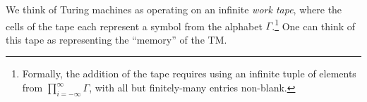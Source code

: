 \documentclass{fkpaper}
\begin{document}
\begin{multicols}{2}
\begin{definition}
\begin{enumerate}[label=\arabic*)]
  \end{enumerate}
\end{definition}
We think of Turing machines as operating on an infinite \emph{work
  tape}, where the cells of the tape each represent a symbol from the
alphabet $\Gamma$.\footnote{Formally, the addition of the tape
  requires using an infinite tuple of elements from
  $\prod_{i=-\infty}^\infty \Gamma$, with all but finitely-many
  entries non-blank.} One can think of this tape as representing the
``memory'' of the TM.


\end{multicols}
\end{document}
